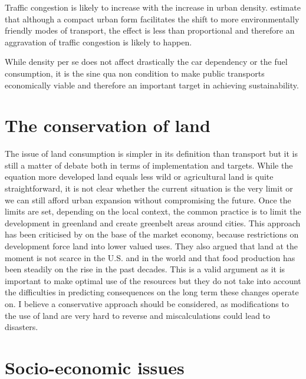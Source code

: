 \documentclass [a4paper,12pt]{article} %
\begin{document}
Traffic congestion is likely to increase with the increase in urban density. \cite{Melia2011} estimate that although a compact urban form facilitates the shift to more environmentally friendly modes of transport, the effect is less than proportional and therefore an aggravation of traffic congestion is likely to happen.

While density per se does not affect drastically the car dependency or the fuel consumption, it is the sine qua non condition to make public transports economically viable and therefore an important target in achieving sustainability.


\section*{The conservation of land}

The issue of land consumption is simpler in its definition than transport but it is still a matter of debate both in terms of implementation and targets. While the equation more developed land equals less wild or agricultural land is quite straightforward, it is not clear whether the current situation is the very limit or we can still afford urban expansion without compromising the future. Once the limits are set, depending on the local context, the common practice is to limit the development in greenland and create greenbelt areas around cities. This approach has been criticised by \cite{Gordon1997} on the base of the market economy, because restrictions on development force land into lower valued uses. They also argued that land at the moment is not scarce in the U.S. and in the world and that food production has been steadily on the rise in the past decades. This is a valid argument as it is important to make optimal use of the resources but they do not take into account the difficulties in predicting consequences on the long term these changes operate on. I believe a conservative approach should be considered, as modifications to the use of land are very hard to reverse and miscalculations could lead to disasters. 

\section*{Socio-economic issues}
\end{document}
